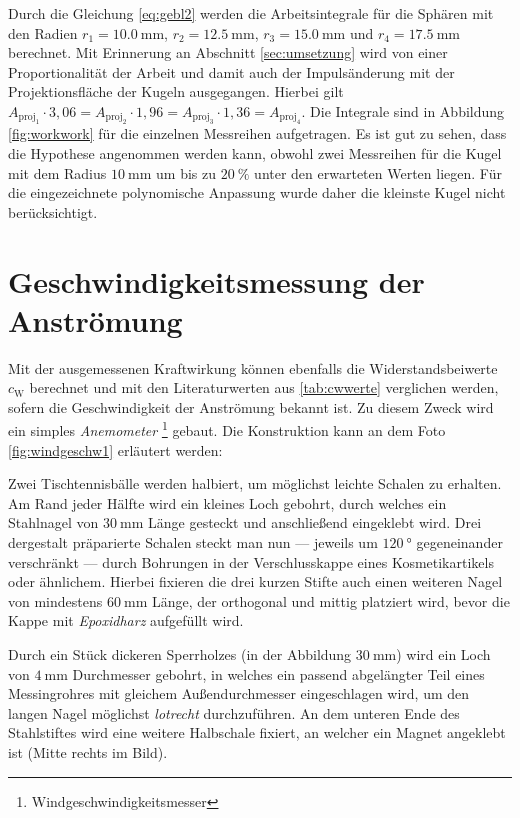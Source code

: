 

\noindent Durch die Gleichung \eqref{eq:gebl2} werden die Arbeitsintegrale für die Sphären mit den Radien $r_1=\SI{10,0}{\milli\metre}$, $r_2=\SI{12,5}{\milli\metre}$, $r_3=\SI{15,0}{\milli\metre}$ und $r_4=\SI{17,5}{\milli\metre}$ berechnet. Mit Erinnerung an Abschnitt \ref{sec:umsetzung} wird von einer Proportionalität der Arbeit und damit auch der Impulsänderung mit der Projektionsfläche der Kugeln ausgegangen. Hierbei gilt $A_\mathrm{proj_1}\cdot 3,06=A_\mathrm{proj_2}\cdot 1,96=A_\mathrm{proj_3}\cdot 1,36=A_\mathrm{proj_4}$. Die Integrale sind in Abbildung \ref{fig:workwork} für die einzelnen Messreihen aufgetragen. Es ist gut zu sehen, dass die Hypothese angenommen werden kann, obwohl zwei Messreihen für die Kugel mit dem Radius $\SI{10}{\milli\metre}$ um bis zu $\SI{20}{\percent}$ unter den erwarteten Werten liegen. Für die eingezeichnete polynomische Anpassung wurde daher die kleinste Kugel nicht berücksichtigt.

\section{Geschwindigkeitsmessung der Anströmung}

Mit der ausgemessenen Kraftwirkung können ebenfalls die Widerstandsbeiwerte $c_\mathrm{W}$ berechnet und mit den Literaturwerten aus \ref{tab:cwwerte} verglichen werden, sofern die Geschwindigkeit der Anströmung bekannt ist.
Zu diesem Zweck wird ein simples \textit{Anemometer} \footnote{Windgeschwindigkeitsmesser} gebaut. Die Konstruktion kann an dem Foto \ref{fig:windgeschw1} erläutert werden:



\noindent Zwei Tischtennisbälle werden halbiert, um möglichst leichte Schalen zu erhalten. Am Rand jeder Hälfte wird ein kleines Loch gebohrt, durch welches ein Stahlnagel von $\SI{30}{\milli\metre}$ Länge gesteckt und anschließend eingeklebt wird. Drei dergestalt präparierte Schalen steckt man nun --- jeweils um $\SI{120}{\degree}$ gegeneinander verschränkt --- durch Bohrungen in der Verschlusskappe eines Kosmetikartikels oder ähnlichem. Hierbei fixieren die drei kurzen Stifte auch einen weiteren Nagel von mindestens $\SI{60}{\milli\metre}$ Länge, der orthogonal und mittig platziert wird, bevor die Kappe mit \textit{Epoxidharz} aufgefüllt wird.

Durch ein Stück dickeren Sperrholzes (in der Abbildung $\SI{30}{\milli\metre}$) wird ein Loch von $\SI{4}{\milli\metre}$ Durchmesser gebohrt, in welches ein passend abgelängter Teil eines Messingrohres mit gleichem Außendurchmesser eingeschlagen wird, um den langen Nagel möglichst \textit{lotrecht} durchzuführen. An dem unteren Ende des Stahlstiftes wird eine weitere Halbschale fixiert, an welcher ein Magnet angeklebt ist (Mitte rechts im Bild). 

